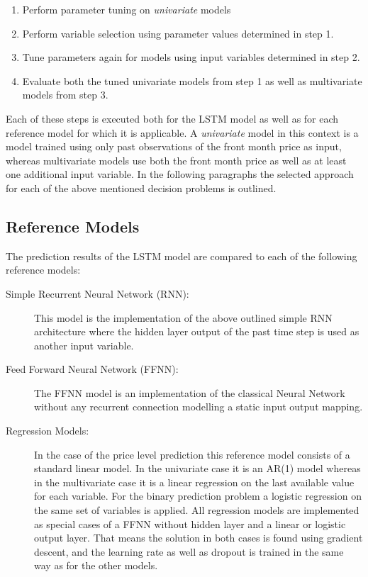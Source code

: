 \begin{enumerate}
\item Perform parameter tuning on \textit{univariate} models
\item Perform variable selection using parameter values determined in step 1.
\item Tune parameters again for models using input variables determined in step 2.
\item Evaluate both the tuned univariate models from step 1 as well as multivariate models from step 3. 
\end{enumerate}
Each of these steps is executed both for the LSTM model as well as for each reference model for which it is applicable.
A \textit{univariate} model in this context is a model trained using only past observations of the front month price as input, whereas multivariate models use both the front month price as well as at least one additional input variable. In the following paragraphs the selected approach for each of the above mentioned decision problems is outlined.

\subsection{Reference Models}
The prediction results of the LSTM model are compared to each of the following reference models:
\begin{description}
\item[Simple Recurrent Neural Network (RNN):] This model is the implementation of the above outlined simple RNN architecture where the hidden layer output of the past time step is used as another input variable.
\item[Feed Forward Neural Network (FFNN):] The FFNN model is an implementation of the classical Neural Network without any recurrent connection modelling  a static input output mapping. 
\item[Regression Models:] In the case of the price level prediction this reference model consists of a standard linear model. In the univariate case it is an AR(1) model whereas in the multivariate case it is a linear regression on the last available value for each variable. For the binary prediction problem a logistic regression on the same set of variables is applied. All regression models are implemented as special cases of a FFNN without hidden layer and a linear or logistic output layer. That means the solution in both cases is found using gradient descent, and the learning rate as well as dropout is trained in the same way as for the other models.
\end{description}


